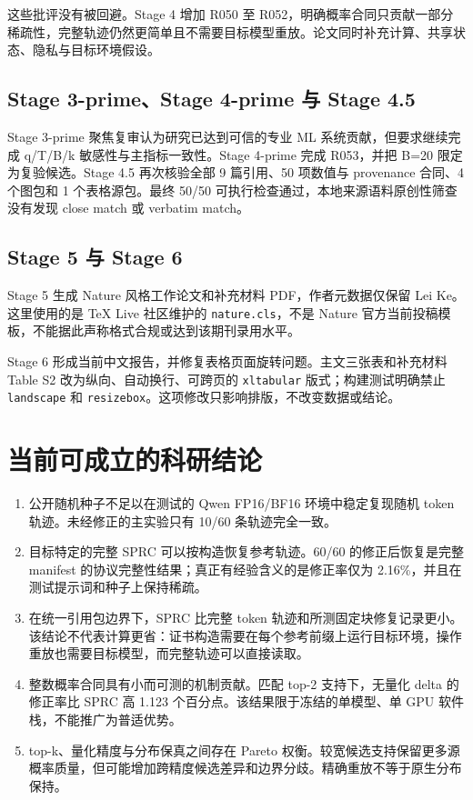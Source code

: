 \documentclass[12pt,a4paper]{article}
\begin{document}
这些批评没有被回避。Stage 4 增加 R050 至 R052，明确概率合同只贡献一部分稀疏性，完整轨迹仍然更简单且不需要目标模型重放。论文同时补充计算、共享状态、隐私与目标环境假设。

\subsection{Stage 3-prime、Stage 4-prime 与 Stage 4.5}

Stage 3-prime 聚焦复审认为研究已达到可信的专业 ML 系统贡献，但要求继续完成 q/T/B/k 敏感性与主指标一致性。Stage 4-prime 完成 R053，并把 B=20 限定为复验候选。Stage 4.5 再次核验全部 9 篇引用、50 项数值与 provenance 合同、4 个图包和 1 个表格源包。最终 50/50 可执行检查通过，本地来源语料原创性筛查没有发现 close match 或 verbatim match。

\subsection{Stage 5 与 Stage 6}

Stage 5 生成 Nature 风格工作论文和补充材料 PDF，作者元数据仅保留 Lei Ke。这里使用的是 TeX Live 社区维护的 \texttt{nature.cls}，不是 Nature 官方当前投稿模板，不能据此声称格式合规或达到该期刊录用水平。

Stage 6 形成当前中文报告，并修复表格页面旋转问题。主文三张表和补充材料 Table S2 改为纵向、自动换行、可跨页的 \texttt{xltabular} 版式；构建测试明确禁止 \texttt{landscape} 和 \texttt{resizebox}。这项修改只影响排版，不改变数据或结论。

\section{当前可成立的科研结论}

\begin{enumerate}[label=\arabic*.]
\item 公开随机种子不足以在测试的 Qwen FP16/BF16 环境中稳定复现随机 token 轨迹。未经修正的主实验只有 10/60 条轨迹完全一致。
\item 目标特定的完整 SPRC 可以按构造恢复参考轨迹。60/60 的修正后恢复是完整 manifest 的协议完整性结果；真正有经验含义的是修正率仅为 2.16\%，并且在测试提示词和种子上保持稀疏。
\item 在统一引用包边界下，SPRC 比完整 token 轨迹和所测固定块修复记录更小。该结论不代表计算更省：证书构造需要在每个参考前缀上运行目标环境，操作重放也需要目标模型，而完整轨迹可以直接读取。
\item 整数概率合同具有小而可测的机制贡献。匹配 top-2 支持下，无量化 delta 的修正率比 SPRC 高 1.123 个百分点。该结果限于冻结的单模型、单 GPU 软件栈，不能推广为普适优势。
\item top-k、量化精度与分布保真之间存在 Pareto 权衡。较宽候选支持保留更多源概率质量，但可能增加跨精度候选差异和边界分歧。精确重放不等于原生分布保持。
\end{enumerate}
\end{document}
